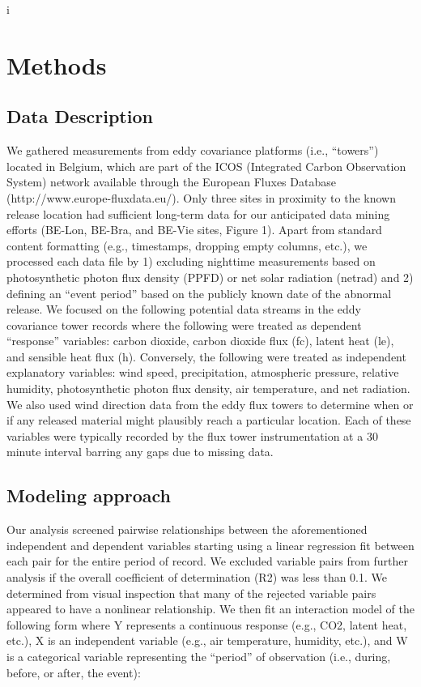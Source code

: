 i\documentclass{article}
\begin{document}
\section{Methods}

\subsection{Data Description}

We gathered measurements from eddy covariance platforms (i.e., “towers”) located in Belgium, which are part of the ICOS (Integrated Carbon Observation System) network available through the European Fluxes Database (http://www.europe-fluxdata.eu/). Only three sites in proximity to the known release location had sufficient long-term data for our anticipated data mining efforts (BE-Lon, BE-Bra, and BE-Vie sites, Figure 1). Apart from standard content formatting (e.g., timestamps, dropping empty columns, etc.), we processed each data file by 1) excluding nighttime measurements based on photosynthetic photon flux density (PPFD) or net solar radiation (netrad) and 2) defining an “event period” based on the publicly known date of the abnormal release. We focused on the following potential data streams in the eddy covariance tower records where the following were treated as dependent “response” variables: carbon dioxide, carbon dioxide flux (fc), latent heat (le), and sensible heat flux (h). Conversely, the following were treated as independent explanatory variables: wind speed, precipitation, atmospheric pressure, relative humidity, photosynthetic photon flux density, air temperature, and net radiation. We also used wind direction data from the eddy flux towers to determine when or if any released material might plausibly reach a particular location. Each of these variables were typically recorded by the flux tower instrumentation at a 30 minute interval barring any gaps due to missing data.

\subsection{Modeling approach}

Our analysis screened pairwise relationships between the aforementioned independent and dependent variables starting using a linear regression fit between each pair for the entire period of record. We excluded variable pairs from further analysis if the overall coefficient of determination (R2) was less than 0.1. We determined from visual inspection that many of the rejected variable pairs appeared to have a nonlinear relationship. We then fit an interaction model of the following form where Y represents a continuous response (e.g., CO2, latent heat, etc.), X is an independent variable (e.g., air temperature, humidity, etc.), and W is a categorical variable representing the “period” of observation (i.e., during, before, or after, the event):
\end{document}
